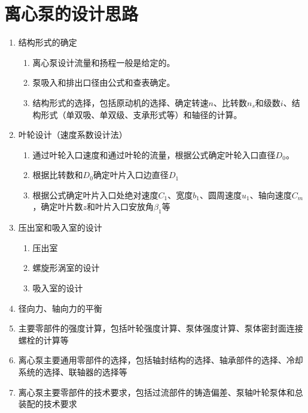 \documentclass{ctexart}
\begin{document}
\section{离心泵的设计思路}
\begin{enumerate}
	\item 结构形式的确定 
	\begin{enumerate}
		\item 离心泵设计流量和扬程一般是给定的。
		\item 泵吸入和排出口径由公式和查表确定。
		\item 结构形式的选择，包括原动机的选择、确定转速$ n $、比转数$ n_s $和级数$ i $、结构形式（单双吸、单双级、支承形式等）和轴径的计算。
	\end{enumerate}
	\item 叶轮设计（速度系数设计法）
	\begin{enumerate}
		\item 通过叶轮入口速度和通过叶轮的流量，根据公式确定叶轮入口直径$ D_0 $。
		\item 根据比转数和$ D_0 $确定叶片入口边直径$ D_1 $
		\item 根据公式确定叶片入口处绝对速度$ C_1 $、宽度$ b_1 $、圆周速度$ u_1 $、轴向速度$ C_m $，确定叶片数$ z $和叶片入口安放角$ \beta_1 $等
	\end{enumerate}
	\item 压出室和吸入室的设计
	\begin{enumerate}
		\item 压出室
		\item 螺旋形涡室的设计
		\item 吸入室的设计
	\end{enumerate}
	\item 径向力、轴向力的平衡
	\item 主要零部件的强度计算，包括叶轮强度计算、泵体强度计算、泵体密封面连接螺栓的计算等
	\item 离心泵主要通用零部件的选择，包括轴封结构的选择、轴承部件的选择、冷却系统的选择、联轴器的选择等
	\item 离心泵主要零部件的技术要求，包括过流部件的铸造偏差、泵轴叶轮泵体和总装配的技术要求
\end{enumerate}
\end{document}
